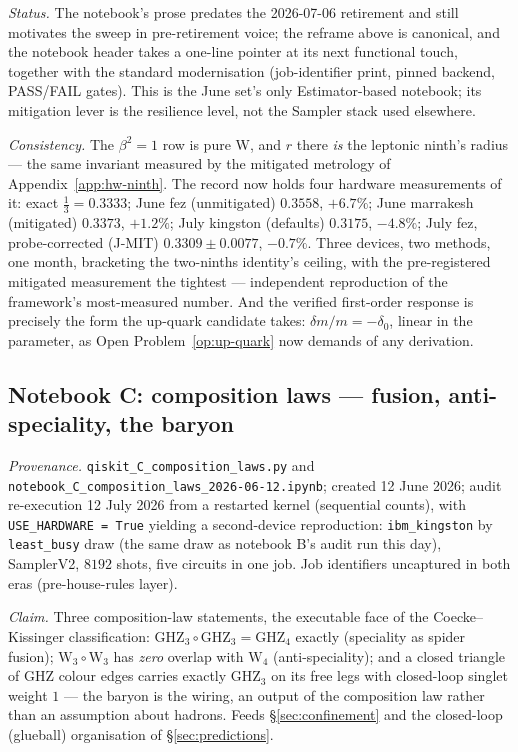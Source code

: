 \emph{Status.} The notebook's prose predates the 2026-07-06 retirement and still motivates the
sweep in pre-retirement voice; the reframe above is canonical, and the notebook header takes a
one-line pointer at its next functional touch, together with the standard modernisation
(job-identifier print, pinned backend, PASS/FAIL gates). This is the June set's only
Estimator-based notebook; its mitigation lever is the resilience level, not the Sampler stack
used elsewhere.

\emph{Consistency.} The $\beta^{2} = 1$ row is pure W, and $r$ there \emph{is} the leptonic
ninth's radius --- the same invariant measured by the mitigated metrology of
Appendix~\ref{app:hw-ninth}. The record now holds four hardware measurements of it: exact
$\tfrac13 = 0.3333$; June fez (unmitigated) $0.3558$, $+6.7\%$; June marrakesh (mitigated)
$0.3373$, $+1.2\%$; July kingston (defaults) $0.3175$, $-4.8\%$; July fez, probe-corrected
(J-MIT) $0.3309 \pm 0.0077$, $-0.7\%$. Three devices, two methods, one month, bracketing the
two-ninths identity's ceiling, with the pre-registered mitigated measurement the tightest ---
independent reproduction of the framework's most-measured number. And the verified first-order
response is precisely the form the up-quark candidate takes: $\delta m/m = -\delta_{0}$, linear
in the parameter, as Open Problem~\ref{op:up-quark} now demands of any derivation.

\subsection{Notebook C: composition laws --- fusion, anti-speciality, the baryon}
\label{app:nb-C}

\emph{Provenance.} \texttt{qiskit\_C\_composition\_laws.py} and
\texttt{notebook\_C\_composition\_laws\_2026-06-12.ipynb}; created 12 June 2026; audit
re-execution 12 July 2026 from a restarted kernel (sequential counts), with
\texttt{USE\_HARDWARE = True} yielding a second-device reproduction: \texttt{ibm\_kingston} by
\texttt{least\_busy} draw (the same draw as notebook B's audit run this day), SamplerV2, $8192$
shots, five circuits in one job. Job identifiers uncaptured in both eras (pre-house-rules layer).

\emph{Claim.} Three composition-law statements, the executable face of the Coecke--Kissinger
classification: $\mathrm{GHZ}_{3} \circ \mathrm{GHZ}_{3} = \mathrm{GHZ}_{4}$ exactly (speciality
as spider fusion); $\mathrm{W}_{3} \circ \mathrm{W}_{3}$ has \emph{zero} overlap with
$\mathrm{W}_{4}$ (anti-speciality); and a closed triangle of GHZ colour edges carries exactly
$\mathrm{GHZ}_{3}$ on its free legs with closed-loop singlet weight $1$ --- the baryon is the
wiring, an output of the composition law rather than an assumption about hadrons. Feeds
\S\ref{sec:confinement} and the closed-loop (glueball) organisation of \S\ref{sec:predictions}.

